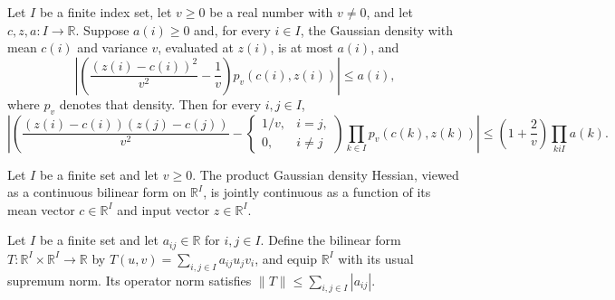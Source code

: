 \begin{lemma}
\leanok
{}
Let $I$ be a finite index set, let $v\ge0$ be a real number with $v\ne0$, and let
$c,z,a:I\to\mathbb R$. Suppose $a(i)\ge0$ and, for every $i\in I$, the Gaussian density
with mean $c(i)$ and variance $v$, evaluated at $z(i)$, is at most $a(i)$, and
\[
\left|\left(\frac{(z(i)-c(i))^2}{v^2}-\frac1v\right)p_v(c(i),z(i))\right|\le a(i),
\]
where $p_v$ denotes that density. Then for every $i,j\in I$,
\[
\left|\left(\frac{(z(i)-c(i))(z(j)-c(j))}{v^2}-\begin{cases}1/v,&i=j,\\0,&i\ne
j\end{cases}\right)\prod_{k\in I}p_v(c(k),z(k))\right|\le\left(1+\frac2v\right)\prod_{k
i I}a(k).
\]
\end{lemma}

\begin{lemma}
\leanok
{}
Let $I$ be a finite set and let $v\ge 0$. The product Gaussian density Hessian, viewed
as a continuous bilinear form on $\mathbb R^I$, is jointly continuous as a function of
its mean vector $c\in\mathbb R^I$ and input vector $z\in\mathbb R^I$.
\end{lemma}

\begin{lemma}
\leanok
{}
Let $I$ be a finite set and let $a_{ij}\in\mathbb R$ for $i,j\in I$. Define the bilinear
form $T\colon\mathbb R^I\times\mathbb R^I\to\mathbb R$ by $T(u,v)=\sum_{i,j\in
I}a_{ij}u_jv_i$, and equip $\mathbb R^I$ with its usual supremum norm. Its operator norm
satisfies $\|T\|\leq\sum_{i,j\in I}|a_{ij}|$.
\end{lemma}

